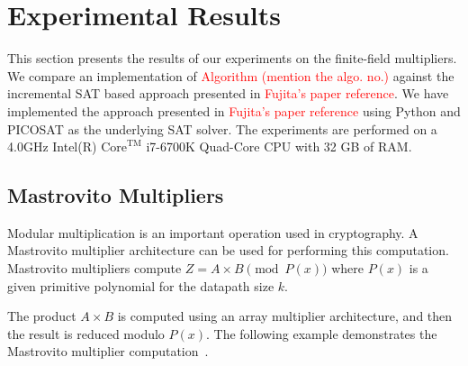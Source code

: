 \section{Experimental Results}
\label{sec:exp}

This section presents the results of our experiments on the finite-field multipliers.
We compare an implementation of \textcolor{red}{Algorithm (mention the algo. no.)}  
against  the incremental SAT based approach presented in \textcolor{red}{Fujita's paper reference}.
We have implemented the approach presented in \textcolor{red}{Fujita's paper reference} using
Python and PICOSAT as the underlying SAT solver. The experiments are performed on a 4.0GHz 
Intel(R) $\text{Core}^{\text{TM}}$ i7-6700K Quad-Core CPU with 32 GB of RAM.   

\subsection{Mastrovito Multipliers}
Modular multiplication is an important operation used in cryptography. 
A Mastrovito multiplier architecture can be used for performing this computation.
Mastrovito multipliers compute $Z = A\times B \pmod{
  P(x)}$ where $P(x)$ is a given primitive polynomial for the datapath size
$k$. 

The product $A \times B$ is computed using an array multiplier architecture, and then the result is reduced modulo $P(x)$.
The following example demonstrates the Mastrovito multiplier computation~\cite{lv:tcad2013}.


